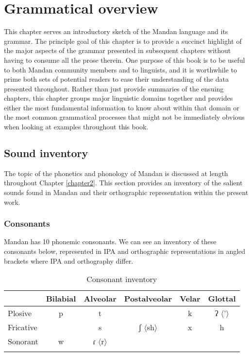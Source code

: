 \chapter{Grammatical overview}\label{ChSketch}

This chapter serves an introductory sketch of the Mandan language and its grammar. The principle goal of this chapter is to provide a succinct highlight of the major aspects of the grammar presented in subsequent chapters without having to consume all the prose therein. One purpose of this book is to be useful to both Mandan community members and to linguists, and it is worthwhile to prime both sets of potential readers to ease their understanding of the data presented throughout. Rather than just provide summaries of the ensuing chapters, this chapter groups major linguistic domains together and provides either the most fundamental information to know about within that domain or the most common grammatical processes that might not be immediately obvious when looking at examples throughout this book.

\section{Sound inventory}\label{CHSk1}

The topic of the phonetics and phonology of Mandan is discussed at length throughout Chapter \ref{chapter2}. This section provides an inventory of the salient sounds found in Mandan and their orthographic representation within the present work.

\subsection{Consonants}\label{CHSk1.1}

Mandan has 10 phonemic consonants. We can see an inventory of these consonants below, represented in IPA and orthographic representations in angled brackets where IPA and orthography differ.

\begin{table}
\caption{Consonant inventory} \label{ChSKconsonantinventory}
\begin{tabular}{lccccc}
\lsptoprule
          & Bilabial & Alveolar & Postalveolar & Velar & Glottal \\
\midrule
Plosive   & p        & t        &               & k     & ʔ $\langle$'$\rangle$    \\ 
Fricative &          & s        & ʃ $\langle$sh$\rangle$          & x     & h       \\ 
Sonorant  & w        & ɾ $\langle$r$\rangle$         &          	&       &         \\ \lspbottomrule
\end{tabular}
\end{table}

